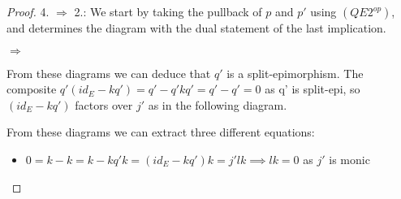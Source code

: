 \documentclass[11pt]{article}
\theoremstyle{definition}
\theoremstyle{remark}
\begin{document}
\begin{proof}
                4. $\Rightarrow$ 2.: We start by taking the pullback of $p$ and $p'$ using $(QE2^{op})$, and determines the diagram with the dual statement of the last implication.
                \begin{center}
                    \space $\Rightarrow$
                \end{center}
                From these diagrams we can deduce that $q'$ is a split-epimorphism. The composite $q'(id_E-kq')=q'-q'kq'=q'-q'=0$ as q' is split-epi, so $(id_E-kq')$ factors over $j'$ as in the following diagram.
                \begin{center}
                \end{center}
                From these diagrams we can extract three different equations:
                \begin{itemize}
                    \item $0=k-k=k-kq'k=(id_E-kq')k=j'lk \implies lk=0$ as $j'$ is monic

\end{itemize}
\end{proof}
\end{document}
